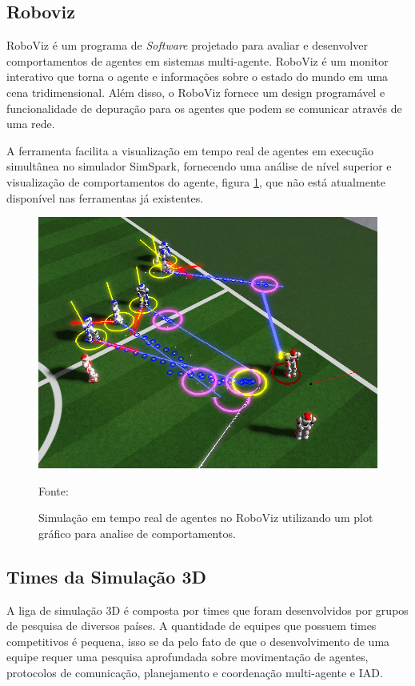 \subsection{Roboviz}
\label{subsec:roboviz}
RoboViz  é um programa de {\it Software} projetado para avaliar e desenvolver comportamentos de agentes em sistemas 
multi-agente. RoboViz é um monitor interativo que torna o agente e informações sobre o 
estado do mundo em uma cena tridimensional. Além disso, o RoboViz fornece um design programável e funcionalidade de depuração
para os agentes que podem se comunicar através de uma rede. 

A ferramenta facilita a visualização em tempo real de agentes em execução simultânea no simulador SimSpark, fornecendo uma análise
de nível superior e visualização de comportamentos do agente, figura \ref{fig:roboviz}, que não está atualmente disponível nas 
ferramentas já existentes.

\begin{figure}[!htb]
\centering
\includegraphics[scale=0.38]{figuras/roboviz.png}
\caption{Simulação em tempo real de agentes no RoboViz utilizando um plot gráfico para analise de comportamentos.} Fonte: \cite{robovizImg} \label{fig:roboviz}
\end{figure}
\FloatBarrier

\subsection{Times da Simulação 3D}
\label{subsec:times3d}
A liga de simulação 3D é composta por times que foram desenvolvidos por grupos de pesquisa de diversos países. A quantidade de
equipes que possuem times competitivos é pequena, isso se da pelo fato de que o desenvolvimento de uma equipe requer uma pesquisa
aprofundada sobre movimentação de agentes, protocolos de comunicação, planejamento e coordenação multi-agente e IAD.

